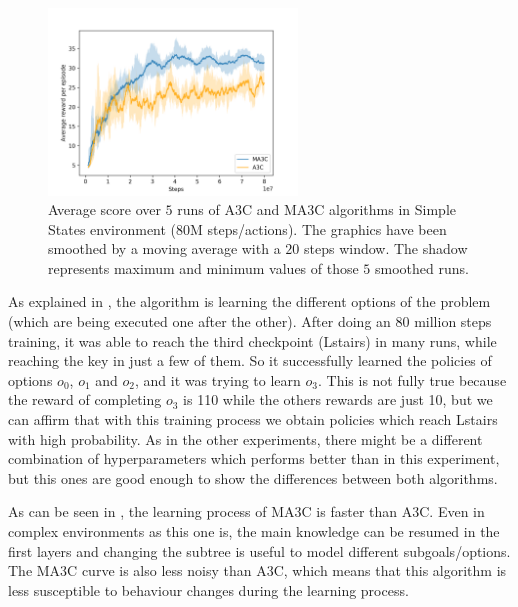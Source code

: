 \begin{figure}[hbtp]
\begin{center}
\includegraphics[width=250]{img/Montezuma_performance.png}
\end{center}
\caption[Montezuma's Revenge performance]
{Average score over $5$ runs of \ac{A3C} and \ac{MA3C} algorithms in Simple States environment (80M steps/actions).
The graphics have been smoothed by a moving average with a $20$ steps window.
The shadow represents maximum and minimum values of those $5$ smoothed runs.}
\label{fig:Montezuma_performance}
\end{figure}

As explained in , the algorithm is learning the different options of the problem (which are
being executed one after the other).
After doing an 80 million steps training, it was able to reach the third checkpoint (Lstairs) in many runs, while reaching
the key in just a few of them.
So it successfully learned the policies of options $o_0$, $o_1$ and $o_2$, and it was trying to learn $o_3$.
This is not fully true because the reward of completing $o_3$ is 110 while the others rewards are just 10, but we can
affirm that with this training process we obtain policies which reach Lstairs with high probability.
As in the other experiments, there might be a different combination of hyperparameters which performs better than in this experiment,
but this ones are good enough to show the differences between both algorithms.


As can be seen in , the learning process of \ac{MA3C} is faster than \ac{A3C}.
Even in complex environments as this one is, the main knowledge can be resumed in the first layers and changing the
subtree is useful to model different subgoals/options.
The \ac{MA3C} curve is also less noisy than \ac{A3C}, which means that this algorithm is less susceptible to
behaviour changes during the learning process.

